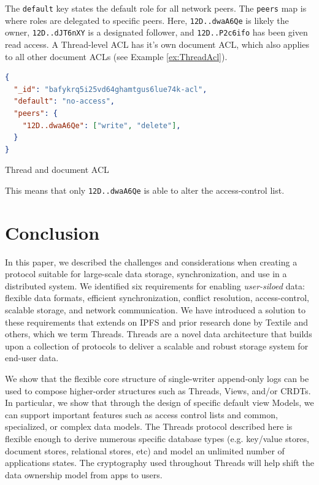 \documentclass{textile}
\begin{document}
The \texttt{default} key states the default role for all network peers. The \texttt{peers} map is where roles are delegated to specific peers. Here, \texttt{12D..dwaA6Qe} is likely the owner, \texttt{12D..dJT6nXY} is a designated follower, and \texttt{12D..P2c6ifo} has been given read access. A Thread-level ACL has it's own document ACL, which also applies to all other document ACLs (see Example \ref{ex:ThreadAcl}).

\begin{example}
  \begin{lstlisting}[language=json,firstnumber=1]
{
  "_id": "bafykrq5i25vd64ghamtgus6lue74k-acl",
  "default": "no-access",
  "peers": {
    "12D..dwaA6Qe": ["write", "delete"],
  }
}
  \end{lstlisting}
\caption{Thread and document ACL}
\label{ex:ThreadAcl}
\end{example} 

This means that only \texttt{12D..dwaA6Qe} is able to alter the access-control list.

\section{Conclusion}

In this paper, we described the challenges and considerations when creating a protocol suitable for large-scale data storage, synchronization, and use in a distributed system. We identified six requirements for enabling \emph{user-siloed} data: flexible data formats, efficient synchronization, conflict resolution, access-control, scalable storage, and network communication. We have introduced a solution to these requirements that extends on IPFS and prior research done by Textile and others, which we term Threads. Threads are a novel data architecture that builds upon a collection of protocols to deliver a scalable and robust storage system for end-user data. 

We show that the flexible core structure of single-writer append-only logs can be used to compose higher-order structures such as Threads, Views, and/or CRDTs. In particular, we show that through the design of specific default view Models, we can support important features such as access control lists and common, specialized, or complex data models. The Threads protocol described here is flexible enough to derive numerous specific database types (e.g. key/value stores, document stores, relational stores, etc) and model an unlimited number of applications states. The cryptography used throughout Threads will help shift the data ownership model from apps to users. 
\end{document}
